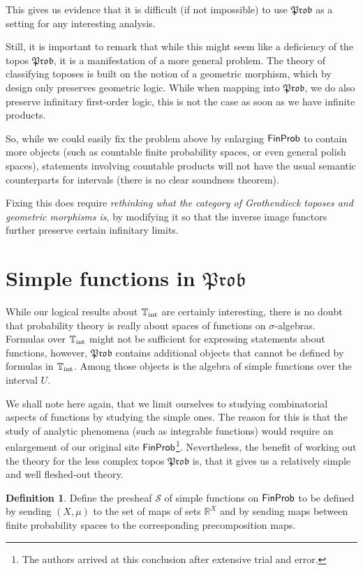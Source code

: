 \documentclass[a4paper]{amsproc}
\theoremstyle{plain}
\theoremstyle{definition}
\newtheorem{definition}[theorem]{Definition}
\theoremstyle{remark}
\numberwithin{equation}{section}
\newcommand{\FinProb}{\textup{\textsf{FinProb}}}
\newcommand{\Prob}{\mathfrak{Prob}}
\begin{document}
This gives us evidence that it is difficult (if not impossible) to use $\Prob$ as a setting for any interesting analysis.

Still, it is important to remark that while this might seem like a deficiency of the topos $\Prob$, it is a manifestation of a more general problem. The theory of classifying toposes is built on the notion of a geometric morphism, which by design only preserves geometric logic. While when mapping into $\Prob$, we do also preserve infinitary first-order logic, this is not the case as soon as we have infinite products.

So, while we could easily fix the problem above by enlarging $\FinProb$ to contain more objects (such as countable finite probability spaces, or even general polish spaces), statements involving countable products will not have the usual semantic counterparts for intervals (there is no clear soundness theorem).

Fixing this does require \emph{rethinking what the category of Grothendieck toposes and geometric morphisms is}, by modifying it so that the inverse image functors further preserve certain infinitary limits.

\section{Simple functions in $\Prob$}\label{section_simple_functions}

While our logical results about $\mathbb{T}_{\textup{int}}$ are certainly interesting, there is no doubt that probability theory is really about spaces of functions on $\sigma$-algebras. Formulas over $\mathbb{T}_{\textup{int}}$ might not be sufficient for expressing statements about functions, however, $\Prob$ contains additional objects that cannot be defined by formulas in $\mathbb{T}_{\textup{int}}$. Among those objects is the algebra of simple functions over the interval $U$.

We shall note here again, that we limit ourselves to studying combinatorial aspects of functions by studying the simple ones. The reason for this is that the study of analytic phenomena (such as integrable functions) would require an enlargement of our original site $\FinProb$\footnote{The authors arrived at this conclusion after extensive trial and error.}. Nevertheless, the benefit of working out the theory for the less complex topos $\Prob$ is, that it gives us a relatively simple and well fleshed-out theory.

\begin{definition}
    Define the presheaf $\mathcal{S}$ of simple functions on $\FinProb$ to be defined by sending $(X,\mu)$ to the set of maps of sets $\mathbb{R}^X$ and by sending maps between finite probability spaces to the corresponding precomposition maps.
\end{definition}
\end{document}
